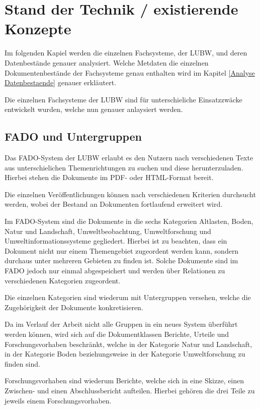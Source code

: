 \section{Stand der Technik / existierende Konzepte} \label{Stand der Technik}
Im folgenden Kapiel werden die einzelnen Fachsysteme, der \ac{LUBW}, und deren Datenbest\"ande genauer analysiert. Welche Metdaten die einzelnen Dokumentenbest\"ande der Fachsysteme genau enthalten wird im Kapitel \ref{Analyse Datenbestaende} genauer erkl\"autert. 

Die einzelnen Fachsysteme der \ac{LUBW} sind f\"ur unterschieliche Einsatzzw\"acke entwickelt wurden, welche nun genauer anlaysiert werden.
\subsection{FADO und Untergruppen} \label{FADO}
Das \ac{FADO}-System der \ac{LUBW} erlaubt es den Nutzern nach verschiedenen Texte aus unterschielichen Themenrichtungen zu suchen und diese herunterzuladen. Hierbei stehen die Dokumente im PDF- oder HTML-Format bereit.

Die einzelnen Ver\"offentlichungen k\"onnen nach verschiedenen Kriterien durchsucht werden, wobei der Bestand an Dokumenten fortlaufend erweitert wird.
\cite{LUBW_FADO}

Im \ac{FADO}-System sind die Dokumente in die sechs Kategorien Altlasten, Boden, Natur und Landschaft, Umweltbeobachtung, Umweltforschung und Umweltinformationssysteme gegliedert. Hierbei ist zu beachten, dass ein Dokument nicht nur einem Themengebiet zugeordent werden kann, sondern durchaus unter mehreren Gebieten zu finden ist. Solche Dokumente sind im \ac{FADO} jedoch nur einmal abgespeichert und werden \"uber Relationen zu verschiedenen Kategorien zugeordent.

Die einzelnen Kategorien sind wiederum mit Untergruppen versehen, welche die Zugeh\"origkeit der Dokumente konkretisieren.

Da im Verlauf der Arbeit nicht alle Gruppen in ein neues System \"uberf\"uhrt werden k\"onnen, wird sich auf die Dokumentklassen Berichte, Urteile und Forschungsvorhaben beschr\"ankt, welche in der Kategorie Natur und Landschaft, in der Kategorie Boden beziehungsweise in der Kategorie Umweltforschung zu finden sind.

Forschungsvorhaben sind wiederum Berichte, welche sich in eine Skizze, einen Zwischen- und einen Abschlussbericht aufteilen. Hierbei geh\"oren die drei Teile zu jeweils einem Forschungsvorhaben.

